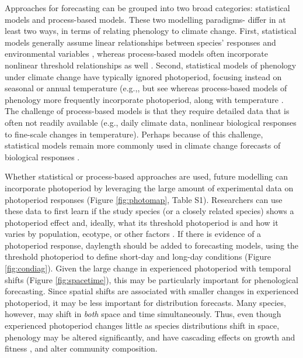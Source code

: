 \documentclass{article}
\begin{document}
\par Approaches for forecasting can be grouped into two broad categories: statistical models and process-based models. These two modelling paradigms- 
differ in at least two ways, in terms of relating phenology to climate change. First, statistical models generally assume linear relationships between species' responses and environmental variables \citep[e.g., ][]{flynn2018,van2007,ibanez2010}, whereas process-based models often incorporate nonlinear threshold relationships as well \citep[e.g.][]{chuine2001,morin2009,xie1989}. Second, statistical models of phenology under climate change have typically ignored photoperiod, focusing instead on seasonal or annual temperature (e.g.,\citep{van2007,ibanez2010,diez2012}, but see \citet[][]{richardson2013}%
whereas process-based models of phenology more frequently incorporate photoperiod, along with temperature \citep{duputie2015,morin2009,xie1989,zhao2013}. The challenge of process-based models is that they require detailed data that is often not readily available (e.g., daily climate data, nonlinear biological responses to fine-scale changes in temperature). Perhaps because of this challenge, statistical models remain more commonly used in climate change forecasts of biological responses \citep[e.g.,][]{Basler:2012, zhu2012,garcia2016,van2007,ibanez2010,diez2012}.

\par Whether statistical or process-based approaches are used, future modelling can incorporate photoperiod by leveraging the large amount of experimental data on photoperiod responses (Figure \ref{fig:photomap}, Table S1). Researchers can use these data to first learn if the study species (or a closely related species) shows a photoperiod effect and, ideally, what its threshold photoperiod is and how it varies by population, ecotype, or other factors \citep{bradshaw2006,gwinner1996,tobin2008}. If there is evidence of a photoperiod response, daylength should be added to forecasting models, using the threshold photoperiod to define short-day and long-day conditions (Figure \ref{fig:condiag}). Given the large change in experienced photoperiod with temporal shifts (Figure \ref{fig:spacetime}), this may be particularly important for phenological forecasting. Since spatial shifts are associated with smaller changes in experienced photoperiod, it may be less important for distribution forecasts. Many species, however, may shift in \emph{both} space and time simultaneously. Thus, even though experienced photoperiod changes little as species distributions shift in space, phenology may be altered significantly, and have cascading effects on growth and fitness \citep{duputie2015}, and alter community  composition.
\end{document}
